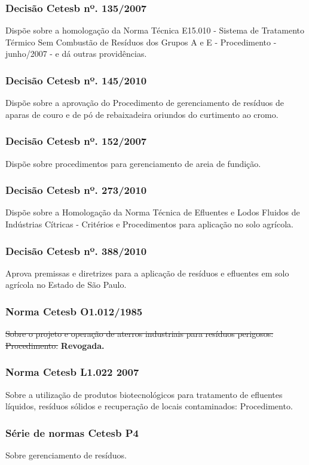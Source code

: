 \begin{subapend}
\begin{subsubapend}
		\subsubsection{Decisão Cetesb nº. 135/2007}
		Dispõe sobre a homologação da Norma Técnica E15.010 - Sistema de Tratamento Térmico Sem Combustão de Resíduos dos Grupos A e E - Procedimento - junho/2007 - e dá outras providências.
		\subsubsection{Decisão Cetesb nº. 145/2010}
		Dispõe sobre a aprovação do Procedimento de gerenciamento de resíduos de aparas de couro e de pó de rebaixadeira oriundos do curtimento ao cromo.
		\subsubsection{Decisão Cetesb nº. 152/2007}
		Dispõe sobre procedimentos para gerenciamento de areia de fundição.
		\subsubsection{Decisão Cetesb nº. 273/2010}
		Dispõe sobre a Homologação da Norma Técnica de Efluentes e Lodos Fluidos de Indústrias Cítricas - Critérios e Procedimentos para aplicação no solo agrícola.
		\subsubsection{Decisão Cetesb nº. 388/2010}
		Aprova premissas e diretrizes para a aplicação de resíduos e efluentes em solo agrícola no Estado de São Paulo.
		\subsubsection{Norma Cetesb O1.012/1985}
		\sout{Sobre o projeto e operação de aterros industriais para resíduos perigosos: Procedimento.} \textbf{Revogada.}
		\subsubsection{Norma Cetesb L1.022 2007}
		Sobre a utilização de produtos biotecnológicos para tratamento de efluentes líquidos, resíduos sólidos e recuperação de locais contaminados: Procedimento.
		\subsubsection{Série de normas Cetesb P4}
		Sobre gerenciamento de resíduos.

\end{subsubapend}
\end{subapend}
